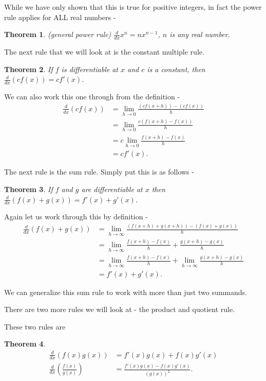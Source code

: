 \documentclass[12pt,reqno]{article}
\newtheorem{Theorem}{Theorem}
\theoremstyle{definition}
\begin{document}
While we have only shown that this is true for positive integers, in fact the power rule applies for ALL real numbers - 
\begin{Theorem}
	(general power rule) $\frac{d}{dx} x^n = n x^{n - 1}$, $n$ is any real number. 
\end{Theorem}

The next rule that we will look at is the constant multiple rule. 
\begin{Theorem}
	If $f$ is differentiable at $x$ and $c$ is a constant, then $\frac{d}{dx} (c f(x)) = c f'(x)$. 
\end{Theorem}

We can also work this one through from the definition - 
\begin{align*}
	\frac{d}{dx} (cf(x)) &= \lim_{h \to 0} \frac{(c f(x + h)) - (c f(x))}{h} \\
						 &= \lim_{h \to 0} \frac{c (f(x + h) - f(x))}{h} \\
						 &= c \lim_{h \to 0} \frac{f(x + h) - f(x)}{h} \\
						 &= c f'(x).
\end{align*}

The next rule is the sum rule. Simply put this is as follows - 
\begin{Theorem}
	If $f$ and $g$ are differentiable at $x$ then $\frac{d}{dx}(f(x) + g(x)) = f'(x) + g'(x)$. 
\end{Theorem}

Again let us work through this by definition - 
\begin{align*}
	\frac{d}{dx} (f(x) + g(x)) &= \lim_{h \to \infty} \frac{(f(x + h) + g(x+h)) - (f(x) + g(x))}{h} \\
						       &= \lim_{h \to \infty} \frac{f(x + h) - f(x)}{h} + \frac{g(x + h) - g(x)}{h} \\
						       &= \lim_{h \to \infty} \frac{f(x + h) - f(x)}{h} + \lim_{h \to \infty} \frac{g(x + h) - g(x)}{h} \\
						       &= f'(x) + g'(x). 
\end{align*}

We can generalize this sum rule to work with more than just two summands. 

There are two more rules we will look at - the product and quotient rule. 

These two rules are 
\begin{Theorem}
	\begin{align*}
		\frac{d}{dx}(f(x) g(x)) &= f'(x) g(x) + f(x) g'(x) \\
		\frac{d}{dx}\left(\frac{f(x)}{g(x)}\right) &= \frac{f'(x) g(x) - f(x) g'(x)}{(g(x))^2}.
	\end{align*}
\end{Theorem}
\end{document}
